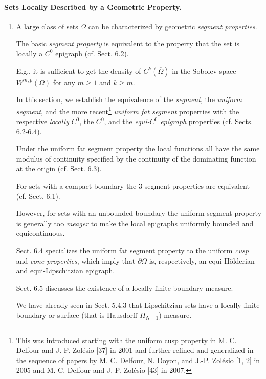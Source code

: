 \documentclass{book}
\numberwithin{equation}{section}
\begin{document}
\paragraph{Sets Locally Described by a Geometric Property.}
\begin{enumerate}
    \item A large class of sets $\Omega$ can be characterized by geometric \textit{segment properties}.
    
    The basic \textit{segment property} is equivalent to the property that the set is locally a $C^0$ epigraph (cf. Sect. 6.2).
    
    E.g., it is sufficient to get the density of $C^k(\overline{\Omega})$ in the Sobolev space $W^{m,p}(\Omega)$ for any $m\ge 1$ and $k\ge m$.
    
    In this section, we establish the equivalence of the \textit{segment}, the \textit{uniform segment}, and the more recent\footnote{This was introduced starting with the uniform cusp property in M. C. Delfour and J.-P. Zolésio [37] in 2001 and further refined and generalized in the sequence of papers by M. C. Delfour, N. Doyon, and J.-P. Zolésio [1, 2] in 2005 and M. C. Delfour and J.-P. Zolésio [43] in 2007.} \textit{uniform fat segment} properties with the respective \textit{locally} $C^0$, the $C^0$, and the \textit{equi-$C^0$ epigraph} properties (cf. Sects. 6.2-6.4).
    
    Under the uniform fat segment property the local functions all have the same modulus of continuity specified by the continuity of the dominating function at the origin (cf. Sect. 6.3).
    
    For sets with a compact boundary the 3 segment properties are equivalent (cf. Sect. 6.1).
    
    However, for sets with an unbounded boundary the uniform segment property is generally too \textit{meager} to make the local epigraphs uniformly bounded and equicontinuous.
    
    Sect. 6.4 specializes the uniform fat segment property to the uniform \textit{cusp} and \textit{cone properties}, which imply that $\partial\Omega$ is, respectively, an equi-Hölderian and equi-Lipschitzian epigraph.
    
    Sect. 6.5 discusses the existence of a locally finite boundary measure.
    
    We have already seen in Sect. 5.4.3 that Lipschitzian sets have a locally finite boundary or surface (that is Hausdorff $H_{N - 1}$) measure.
    

\end{enumerate}
\end{document}
